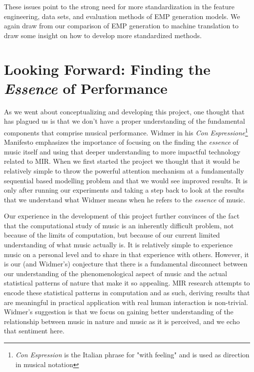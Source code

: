 These issues point to the strong need for more standardization in the feature engineering, data sets, and evaluation methods of EMP generation models. We again draw from our comparison of EMP generation to machine translation to draw some insight on how to develop more standardized methods.

\section{Looking Forward: Finding the \emph{Essence} of Performance}
As we went about conceptualizing and developing this project, one thought that has plagued us is that we don't have a proper understanding of the fundamental components that comprise musical performance. Widmer in his \emph{Con Espressione}\footnote{\emph{Con Espression} is the Italian phrase for "with feeling" and is used as direction in musical notation} Manifesto\cite{widmer2016getting} emphasizes the importance of focusing on the finding the \emph{essence} of music itself and using that deeper understanding to more impactful technology related to MIR. When we first started the project we thought that it would be relatively simple to throw the powerful attention mechanism at a fundamentally sequential based modelling problem and that we would see improved results. It is only after running our experiments and taking a step back to look at the results that we understand what Widmer means when he refers to the \emph{essence} of music. 

Our experience in the development of this project further convinces of the fact that the computational study of music is an inherently difficult problem, not because of the limits of computation, but because of our current limited understanding of what music actually is. It is relatively simple to experience music on a personal level and to share in that experience with others. However, it is our (and Widmer's) conjecture that there is a fundamental disconnect between our understanding of the phenomenological aspect of music and the actual statistical patterns of nature that make it so appealing. MIR research attempts to encode these statistical patterns in computation and as such, deriving results that are meaningful in practical application with real human interaction is non-trivial. Widmer's suggestion is that we focus on gaining better understanding of the relationship between music in nature and music as it is perceived, and we echo that sentiment here. 

